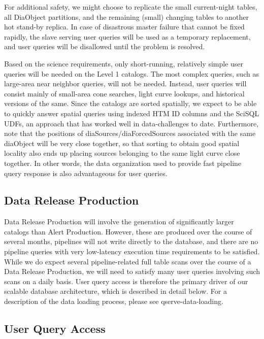 \documentclass[DM,lsstdraft,toc]{lsstdoc}
\begin{document}
For additional safety, we might choose to replicate the small
current-night tables, all DiaObject partitions, and the remaining
(small) changing tables to another hot stand-by replica. In case of
disastrous master failure that cannot be fixed rapidly, the slave
serving user queries will be used as a temporary replacement, and user
queries will be disallowed until the problem is resolved.

Based on the science requirements, only short-running, relatively simple
user queries will be needed on the Level 1 catalogs. The most complex
queries, such as large-area near neighbor queries, will not be needed.
Instead, user queries will consist mainly of small-area cone searches,
light curve lookups, and historical versions of the same. Since the
catalogs are sorted spatially, we expect to be able to quickly answer
spatial queries using indexed HTM ID columns and the SciSQL UDFs, an
approach that has worked well in data-challenges to date. Furthermore,
note that the positions of diaSources/diaForcedSources associated with
the same diaObject will be very close together, so that sorting to
obtain good spatial locality also ends up placing sources belonging to
the same light curve close together. In other words, the data
organization used to provide fast pipeline query response is also
advantageous for user queries.

\subsection{Data Release Production}\label{data-release-production}

Data Release Production will involve the generation of significantly
larger catalogs than Alert Production. However, these are produced over
the course of several months, pipelines will not write directly to the
database, and there are no pipeline queries with very low-latency
execution time requirements to be satisfied. While we do expect several
pipeline-related full table scans over the course of a Data Release
Production, we will need to satisfy many user queries involving such
scans on a daily basis. User query access is therefore the primary
driver of our scalable database architecture, which is described in
detail below. For a description of the data loading process, please see
qserve-data-loading.

\subsection{User Query Access}\label{user-query-access}
\end{document}
